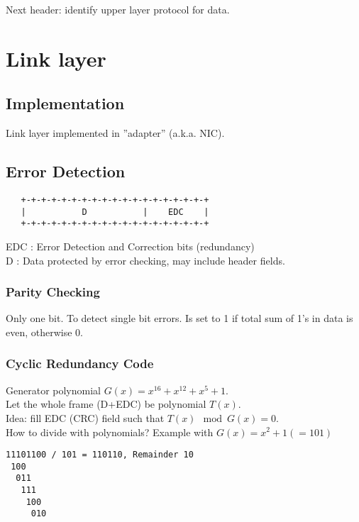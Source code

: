 \documentclass[10pt, a4paper, twocolumn]{scrartcl}
\begin{document}
Next header: identify upper layer protocol for data.

\section{Link layer}

\subsection{Implementation}

Link layer implemented in ''adapter'' (a.k.a. NIC).

\subsection{Error Detection}

\scriptsize
\begin{verbatim}
   +-+-+-+-+-+-+-+-+-+-+-+-+-+-+-+-+-+-+
   |           D           |    EDC    |
   +-+-+-+-+-+-+-+-+-+-+-+-+-+-+-+-+-+-+
\end{verbatim}
\normalsize

EDC : Error Detection and Correction bits (redundancy)\\
D : Data protected by error checking, may include header fields.

\subsubsection{Parity Checking}

Only one bit. To detect single bit errors. Is set to 1 if total sum of 1's in data is even, otherwise 0.

\subsubsection{Cyclic Redundancy Code}

Generator polynomial $G(x) = x^{16}+x^{12}+x^5+1$.\\
Let the whole frame (D+EDC) be polynomial $T(x)$.\\

Idea: fill EDC (CRC) field such that $T(x) \mod G(x) = 0$.\\

How to divide with polynomials? Example with $G(x)=x^2+1(=101)$\\
\begin{verbatim}
11101100 / 101 = 110110, Remainder 10
 100
  011
   111
    100
     010
\end{verbatim}
\end{document}
